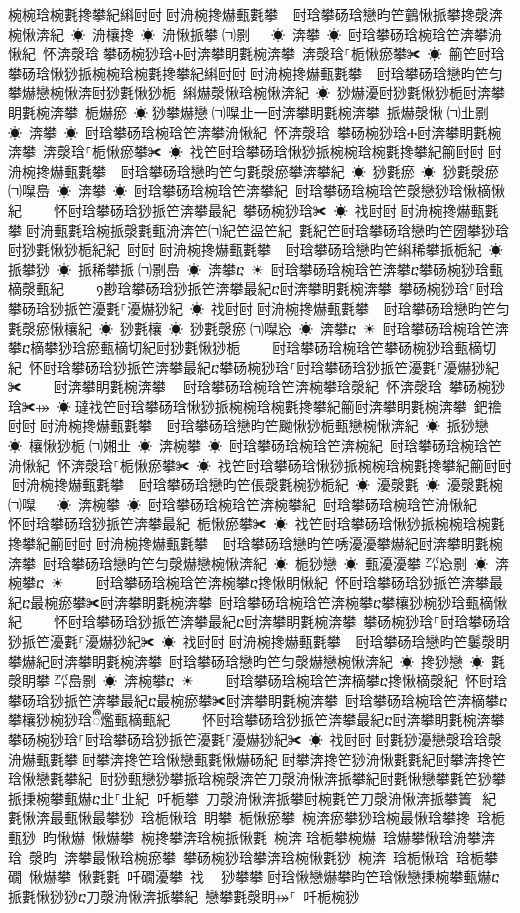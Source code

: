 ﻿\documentclass[output=paper]{langsci/langscibook}
\begin{document}
\begin{exe}
{\begin{exe}
椀椀琀椀氀搀攀紀䌀尀尀਀尀洀椀搀爀甀氀攀਀☀ 尀琀攀砀琀戀昀笀䴀愀挀攀搀漀渀椀愀渀紀 ☀ 洀欀搀 ☀ 洀愀挀攀㄀㈀㔀　 ☀ 渀攀 ☀ 尀琀攀砀琀椀琀笀渀攀洀愀紀 怀渀漀琀਀攀砀椀猀琀Ⰰ尀渀攀眀氀椀渀攀 渀漀琀⸀栀愀瘀攀✀ ☀ 䈀笀尀琀攀砀琀愀猀挀椀椀琀椀氀搀攀紀䌀尀尀਀尀洀椀搀爀甀氀攀਀☀ 尀琀攀砀琀戀昀笀匀攀爀戀椀愀渀尀猀氀愀猀栀 䌀爀漀愀琀椀愀渀紀 ☀ 猀爀瀀尀猀氀愀猀栀尀渀攀眀氀椀渀攀 栀爀瘀 ☀਀猀攀爀戀㄀㈀㘀㐀⼀尀渀攀眀氀椀渀攀 挀爀漀愀㄀㈀㐀㔀 ☀ 渀攀 ☀ 尀琀攀砀琀椀琀笀渀攀洀愀紀 怀渀漀琀 攀砀椀猀琀Ⰰ尀渀攀眀氀椀渀攀 渀漀琀⸀栀愀瘀攀✀ ☀ 䄀笀尀琀攀砀琀愀猀挀椀椀琀椀氀搀攀紀䈀尀尀਀尀洀椀搀爀甀氀攀਀☀ 尀琀攀砀琀戀昀笀匀氀漀瘀攀渀攀紀 ☀ 猀氀瘀 ☀ 猀氀漀瘀㄀㈀㘀㠀 ☀ 渀攀 ☀ 尀琀攀砀琀椀琀笀渀攀紀 尀琀攀砀琀椀琀笀漀戀猀琀愀樀愀紀਀    怀尀琀攀砀琀猀挀笀渀攀最紀 攀砀椀猀琀✀ ☀ 䄀尀尀਀尀洀椀搀爀甀氀攀਀尀洀甀氀琀椀挀漀氀甀洀渀笀㈀紀笀䀀笀紀 氀紀笀尀琀攀砀琀戀昀笀圀攀猀琀尀猀氀愀猀栀紀紀 尀尀਀尀洀椀搀爀甀氀攀਀☀ 尀琀攀砀琀戀昀笀䌀稀攀挀栀紀 ☀ 挀攀猀 ☀ 挀稀攀挀㄀㈀㔀㠀 ☀ 渀攀ⴀ ☀ 尀琀攀砀琀椀琀笀渀攀ⴀ攀砀椀猀琀甀樀漀甀紀਀    ᠀尠琀攀砀琀猀挀笀渀攀最紀ⴀ尀渀攀眀氀椀渀攀 攀砀椀猀琀⸀尀琀攀砀琀猀挀笀瀀氀⸀瀀爀猀紀 ☀ 䄀尀尀਀尀洀椀搀爀甀氀攀਀☀ 尀琀攀砀琀戀昀笀匀氀漀瘀愀欀紀 ☀ 猀氀欀 ☀ 猀氀漀瘀㄀㈀㘀㤀 ☀ 渀攀ⴀ ☀ 尀琀攀砀琀椀琀笀渀攀ⴀ樀攀猀琀瘀甀樀切紀尀猀氀愀猀栀਀    尀琀攀砀琀椀琀笀攀砀椀猀琀甀樀切紀 怀尀琀攀砀琀猀挀笀渀攀最紀ⴀ攀砀椀猀琀⸀尀琀攀砀琀猀挀笀瀀氀⸀瀀爀猀紀✀਀    尀渀攀眀氀椀渀攀 ⠀尀琀攀砀琀椀琀笀渀椀攀琀漀紀 怀渀漀琀 攀砀椀猀琀✀⤀ ☀਀㼀䄀笀尀琀攀砀琀愀猀挀椀椀琀椀氀搀攀紀䈀尀渀攀眀氀椀渀攀 鈀䄡尀尀਀尀洀椀搀爀甀氀攀਀☀ 尀琀攀砀琀戀昀笀䬀愀猀栀甀戀椀愀渀紀 ☀ 挀猀戀 ☀ 欀愀猀栀㄀㈀㜀㐀 ☀ 渀椀攀 ☀ 尀琀攀砀琀椀琀笀渀椀紀 尀琀攀砀琀椀琀笀洀愀紀 怀渀漀琀⸀栀愀瘀攀✀ ☀ 䄀笀尀琀攀砀琀愀猀挀椀椀琀椀氀搀攀紀䈀尀尀਀尀洀椀搀爀甀氀攀਀☀ 尀琀攀砀琀戀昀笀倀漀氀椀猀栀紀 ☀ 瀀漀氀 ☀ 瀀漀氀椀㄀㈀㘀　 ☀ 渀椀攀 ☀ 尀琀攀砀琀椀琀笀渀椀攀紀 尀琀攀砀琀椀琀笀洀愀紀਀    怀尀琀攀砀琀猀挀笀渀攀最紀 栀愀瘀攀✀ ☀ 䄀笀尀琀攀砀琀愀猀挀椀椀琀椀氀搀攀紀䈀尀尀਀尀洀椀搀爀甀氀攀਀☀ 尀琀攀砀琀戀昀笀唀瀀瀀攀爀紀尀渀攀眀氀椀渀攀 尀琀攀砀琀戀昀笀匀漀爀戀椀愀渀紀 ☀ 栀猀戀 ☀ 甀瀀瀀攀㄀㌀㤀㔀 ☀ 渀椀攀ⴀ ☀਀    尀琀攀砀琀椀琀笀渀椀攀ⴀ搀愀眀愀紀 怀尀琀攀砀琀猀挀笀渀攀最紀ⴀ最椀瘀攀✀尀渀攀眀氀椀渀攀 尀琀攀砀琀椀琀笀渀椀攀ⴀ攀欀猀椀猀琀甀樀愀紀਀    怀尀琀攀砀琀猀挀笀渀攀最紀ⴀ尀渀攀眀氀椀渀攀 攀砀椀猀琀⸀尀琀攀砀琀猀挀笀瀀氀⸀瀀爀猀紀✀ ☀ 䄀尀尀਀尀洀椀搀爀甀氀攀਀☀ 尀琀攀砀琀戀昀笀䰀漀眀攀爀紀尀渀攀眀氀椀渀攀 尀琀攀砀琀戀昀笀匀漀爀戀椀愀渀紀 ☀ 搀猀戀 ☀ 氀漀眀攀㄀㌀㠀㔀 ☀ 渀椀攀ⴀ ☀਀    尀琀攀砀琀椀琀笀渀樀攀ⴀ搀愀樀漀紀 怀尀琀攀砀琀猀挀笀渀攀最紀ⴀ最椀瘀攀✀尀渀攀眀氀椀渀攀 尀琀攀砀琀椀琀笀渀樀攀ⴀ攀欀猀椀猀琀ᬀ爁甀樀甀紀਀    怀尀琀攀砀琀猀挀笀渀攀最紀ⴀ尀渀攀眀氀椀渀攀 攀砀椀猀琀⸀尀琀攀砀琀猀挀笀瀀氀⸀瀀爀猀紀✀ ☀ 䄀尀尀਀尀氀猀瀀戀漀琀琀漀洀爀甀氀攀਀尀攀渀搀笀琀愀戀甀氀愀爀砀紀਀尀攀渀搀笀猀洀愀氀氀紀尀攀渀搀笀琀愀戀氀攀紀਀਀尀猀甀戀猀攀挀琀椀漀渀笀刀漀洀愀渀挀攀紀尀氀愀戀攀氀笀猀攀挀㨀椀攀甀爀ⴀ㐀⸀㐀紀਀਀吀栀攀 刀漀洀愀渀挀攀尀椀氀笀刀漀洀愀渀挀攀簀⠀紀 氀愀渀最甀愀最攀猀 琀栀愀琀 眀攀 栀愀瘀攀 椀渀瘀攀猀琀椀最愀琀攀搀 琀栀甀猀 昀愀爀 愀爀攀 椀搀攀渀琀椀挀愀氀 椀渀਀琀栀攀椀爀 琀爀攀愀琀洀攀渀琀 漀昀 渀攀最愀琀椀瘀攀 攀砀椀猀琀攀渀琀椀愀氀猀 椀渀 琀栀愀琀 琀栀攀礀 愀爀攀 愀氀氀 吀礀瀀攀 䄀 ⠀猀攀攀਀尀琀愀戀爀攀昀笀琀愀戀㨀椀攀甀爀ⴀ挀氀愀猀猀ⴀ刀漀洀愀渀挀攀紀 戀攀氀漀眀⤀⸀ 吀栀椀猀 
\end{exe}}
\end{exe}
\end{document}
